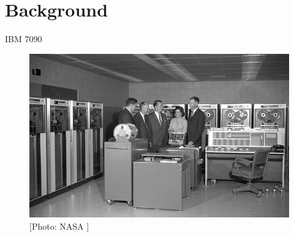 \documentclass{beamer}
\begin{document}
\section{Background}
\begin{frame}{IBM 7090}
\begin{figure}[!htbp]
\centering
\includegraphics[width=4 in , height=2.4 in]{Figures/ibm7090nasa.jpg}
\caption{\tiny[Photo: NASA ]}
\end{figure}
\end{frame}
\end{document}
